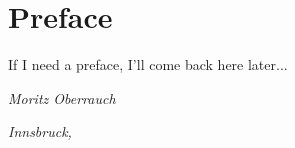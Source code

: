\chapter*{Preface}
\thispagestyle{plain}

If I need a preface, I'll come back here later...

\begin{flushright}
\textit{Moritz Oberrauch}

\textit{Innsbruck, \monthyeardate{\today}} 
\end{flushright}
